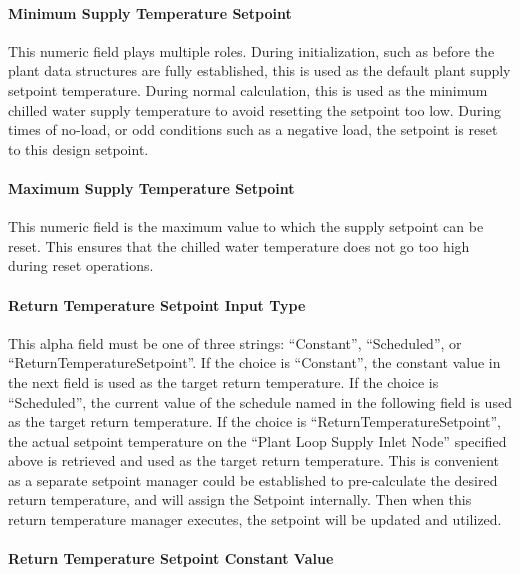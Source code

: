 \paragraph{Minimum Supply Temperature Setpoint}\label{minimum-supply-temperature-setpoint}

This numeric field plays multiple roles. During initialization, such as before the plant data structures are fully established, this is used as the default plant supply setpoint temperature. During normal calculation, this is used as the minimum chilled water supply temperature to avoid resetting the setpoint too low. During times of no-load, or odd conditions such as a negative load, the setpoint is reset to this design setpoint.

\paragraph{Maximum Supply Temperature Setpoint}\label{maximum-supply-temperature-setpoint}

This numeric field is the maximum value to which the supply setpoint can be reset. This ensures that the chilled water temperature does not go too high during reset operations.

\paragraph{Return Temperature Setpoint Input Type}\label{return-temperature-setpoint-input-type}

This alpha field must be one of three strings: ``Constant'', ``Scheduled'', or ``ReturnTemperatureSetpoint''. If the choice is ``Constant'', the constant value in the next field is used as the target return temperature. If the choice is ``Scheduled'', the current value of the schedule named in the following field is used as the target return temperature. If the choice is ``ReturnTemperatureSetpoint'', the actual setpoint temperature on the ``Plant Loop Supply Inlet Node'' specified above is retrieved and used as the target return temperature. This is convenient as a separate setpoint manager could be established to pre-calculate the desired return temperature, and will assign the Setpoint internally. Then when this return temperature manager executes, the setpoint will be updated and utilized.

\paragraph{Return Temperature Setpoint Constant Value}\label{return-temperature-setpoint-constant-value}

